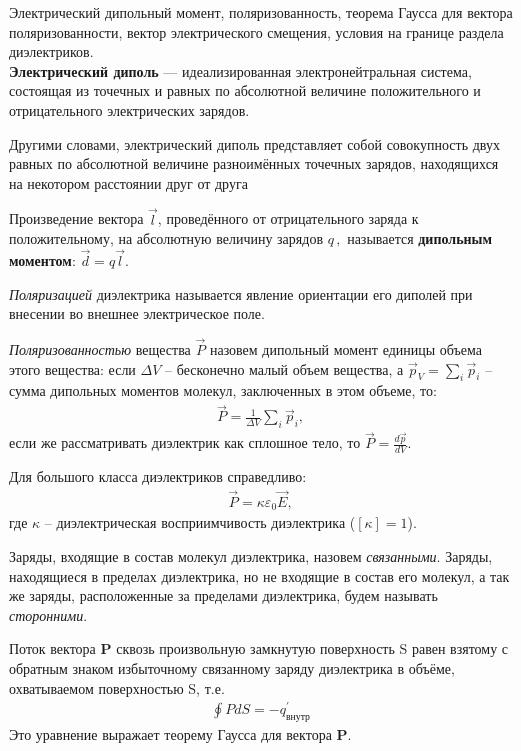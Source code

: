 \documentclass[__main__.tex]{subfiles}
\begin{document}
Электрический дипольный момент, поляризованность, теорема Гаусса для вектора поляризованности, вектор электрического смещения, условия на границе раздела диэлектриков.\\ 

\textbf{Электрический диполь} — идеализированная электронейтральная система, состоящая из точечных и равных по абсолютной величине положительного и отрицательного электрических зарядов.

Другими словами, электрический диполь представляет собой совокупность двух равных по абсолютной величине разноимённых точечных зарядов, находящихся на некотором расстоянии друг от друга

Произведение вектора $ \vec l$, проведённого от отрицательного заряда к положительному, на абсолютную величину зарядов $ q\,,$ называется \textbf{дипольным моментом}: $\vec d=q\vec l$.

\begin{definition}
	\emph{Поляризацией} диэлектрика называется явление ориентации его диполей при внесении во внешнее электрическое поле.
\end{definition}

\begin{definition}
	\emph{Поляризованностью} вещества $\vec{P}$ назовем дипольный момент единицы объема этого вещества: если $\Delta V$ -- бесконечно малый объем вещества, а $\vec{p}_V = \sum_{i}\vec{p}_i$ -- сумма дипольных моментов молекул, заключенных в этом объеме, то:
	\begin{gather}
		\vec{P} = \frac{1}{\Delta V}\sum_{i}\vec{p}_i,
	\end{gather}
	если же рассматривать диэлектрик как сплошное тело, то $\vec{P}=\frac{d\vec{p}}{dV}$.
\end{definition}

Для большого класса диэлектриков справедливо:
\begin{gather}
	\vec{P} = \kappa\varepsilon_0\vec{E},
\end{gather}
где $\kappa$ -- диэлектрическая восприимчивость диэлектрика ($[\kappa]=1$).

Заряды, входящие в состав молекул диэлектрика, назовем \emph{связанными}. Заряды, находящиеся в пределах диэлектрика, но не входящие в состав его молекул, а так же заряды, расположенные за пределами диэлектрика, будем называть \emph{сторонними}.

\begin{theorem}
	Поток вектора \textbf{P} сквозь произвольную замкнутую поверхность S равен взятому с обратным знаком избыточному связанному заряду диэлектрика в объёме, охватываемом поверхностью S, т.е. 
	\begin{gather}
		\oint P dS = -q^{'}_{внутр}
	\end{gather}
	Это уравнение выражает теорему Гаусса для вектора \textbf{P}.
\end{theorem}
\end{document}
